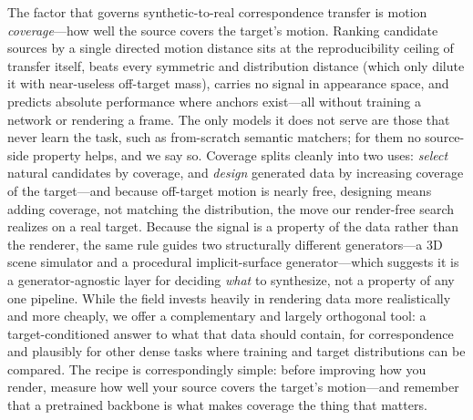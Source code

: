 \documentclass[runningheads]{llncs}
\begin{document}
The factor that governs synthetic-to-real correspondence transfer is motion
\emph{coverage}---how well the source covers the target's motion. Ranking
candidate sources by a single directed motion distance sits at the
reproducibility ceiling of transfer itself, beats every symmetric and
distribution distance (which only dilute it with near-useless off-target mass),
carries no signal in appearance space, and predicts absolute performance where
anchors exist---all without training a network or rendering a frame. The only
models it does not serve are those that never learn the task, such as
from-scratch semantic matchers; for them no source-side property helps, and we
say so. Coverage splits cleanly into two uses: \emph{select} natural candidates
by coverage, and \emph{design} generated data by increasing coverage of the
target---and because off-target motion is nearly free, designing means adding
coverage, not matching the distribution, the move our render-free search
realizes on a real target. Because the signal is a property
of the data rather than the renderer, the same rule guides two structurally
different generators---a 3D scene simulator and a procedural implicit-surface
generator---which suggests it is a generator-agnostic layer for deciding
\emph{what} to synthesize, not a property of any one pipeline. While the field
invests heavily in rendering data more realistically and more cheaply, we offer
a complementary and largely orthogonal tool: a target-conditioned answer to what
that data should contain, for correspondence and plausibly for other dense tasks
where training and target distributions can be compared. The recipe is
correspondingly simple: before improving how you render, measure how well your
source covers the target's motion---and remember that a pretrained backbone is
what makes coverage the thing that matters.



\end{document}

